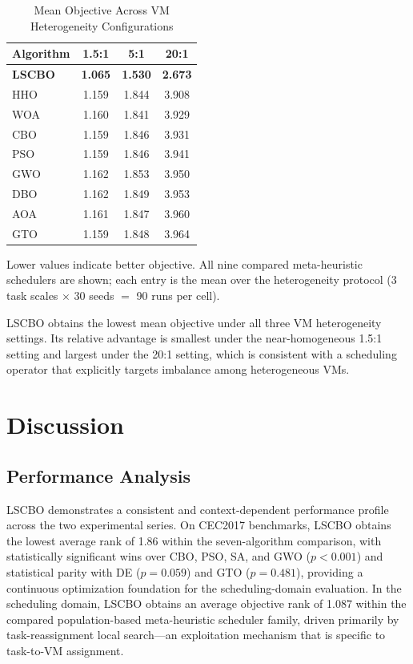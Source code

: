 \documentclass[pdflatex,onecolumn,sn-mathphys-num]{sn-jnl}
\begin{document}
\begin{table}[ht]
\centering
\caption{Mean Objective Across VM Heterogeneity Configurations}\label{tab:vm_heterogeneity}
\begin{tabular}{l c c c}
\toprule
\textbf{Algorithm} & \textbf{1.5:1} & \textbf{5:1} & \textbf{20:1} \\
\midrule
\textbf{LSCBO} & \textbf{1.065} & \textbf{1.530} & \textbf{2.673} \\
HHO & 1.159 & 1.844 & 3.908 \\
WOA & 1.160 & 1.841 & 3.929 \\
CBO & 1.159 & 1.846 & 3.931 \\
PSO & 1.159 & 1.846 & 3.941 \\
GWO & 1.162 & 1.853 & 3.950 \\
DBO & 1.162 & 1.849 & 3.953 \\
AOA & 1.161 & 1.847 & 3.960 \\
GTO & 1.159 & 1.848 & 3.964 \\
\bottomrule
\end{tabular}
\smallskip
\footnotesize{Lower values indicate better objective. All nine compared meta-heuristic schedulers are shown; each entry is the mean over the heterogeneity protocol (3 task scales $\times$ 30 seeds $=$ 90 runs per cell).}
\end{table}

LSCBO obtains the lowest mean objective under all three VM heterogeneity settings. Its relative advantage is smallest under the near-homogeneous 1.5:1 setting and largest under the 20:1 setting, which is consistent with a scheduling operator that explicitly targets imbalance among heterogeneous VMs.

\section{Discussion}\label{sec6}

\subsection{Performance Analysis}
LSCBO demonstrates a consistent and context-dependent performance profile across the two experimental series. On CEC2017 benchmarks, LSCBO obtains the lowest average rank of 1.86 within the seven-algorithm comparison, with statistically significant wins over CBO, PSO, SA, and GWO ($p < 0.001$) and statistical parity with DE ($p = 0.059$) and GTO ($p = 0.481$), providing a continuous optimization foundation for the scheduling-domain evaluation. In the scheduling domain, LSCBO obtains an average objective rank of 1.087 within the compared population-based meta-heuristic scheduler family, driven primarily by task-reassignment local search---an exploitation mechanism that is specific to task-to-VM assignment.
\end{document}
